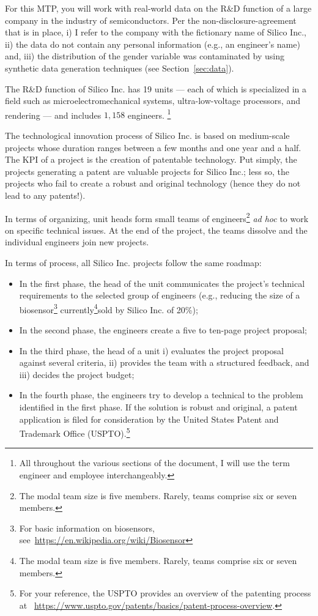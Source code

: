 \documentclass[11pt]{article}
\begin{document}
For this MTP, you will work with real-world data on the R\&D function of a large
company in the industry of semiconductors. Per the non-disclosure-agreement that
is in place, i) I refer to the company with the fictionary name of Silico
Inc., ii) the data do not contain any personal information (e.g., an engineer's
name) and, iii) the distribution of the gender variable  was contaminated by
using synthetic data generation techniques (see Section~\ref{sec:data}).

The R\&D function of Silico Inc. has 19 units --- each of which
is specialized in a field such as microelectromechanical systems, ultra-low-voltage
processors, and rendering --- and includes $1,158$ engineers.  \footnote{All
throughout the various sections of the document, I will use the term engineer
and employee interchangeably.}

The technological innovation process of Silico Inc. is based on 
medium-scale projects whose duration ranges between a few months and one year and a
half. The KPI of a project is the creation of patentable technology. Put
simply, the projects generating a patent are valuable projects for Silico Inc.;
less so, the projects who fail to create a robust and original technology (hence
they do not lead to any patents!).

In terms of organizing, unit heads form small teams of engineers\footnote{The
modal team size is five members. Rarely, teams comprise six or seven members.}
\emph{ad hoc} to work on specific technical issues. At the end of the project,
the teams dissolve and the individual engineers join new projects. 

In terms of process, all Silico Inc. projects follow the same roadmap:

\begin{itemize}
	\item In the first phase, the head of the unit communicates the
	project's technical requirements to the selected group of engineers
	(e.g., reducing  the size of a biosensor\footnote{For basic information
	on biosensors, see~\url{https://en.wikipedia.org/wiki/Biosensor}} 
	currently\footnote{The modal team size is five members. Rarely, teams
	comprise six or seven members.}sold by Silico Inc. of 20\%);
	\item In the second phase, the engineers create a five to ten-page 
	project proposal;
	\item In the third phase, the head of a unit i) evaluates the project 
	proposal against several criteria, ii) provides the team with a
	structured feedback, and iii) decides the project budget;
	\item In the fourth phase, the engineers try to develop a technical
	to the problem identified in the first phase. If the solution
	is robust and original, a patent application is filed for consideration
	by the United States Patent and Trademark Office (USPTO).\footnote{For
	your reference, the USPTO provides an overview of the patenting process
	at~ \url{https://www.uspto.gov/patents/basics/patent-process-overview}.}
\end{itemize}
\end{document}
